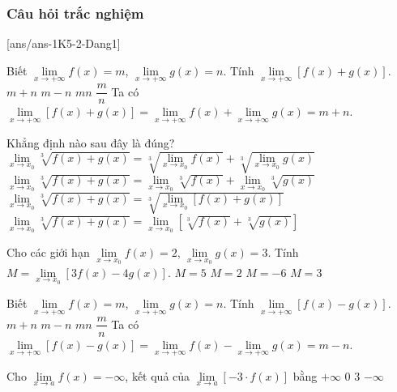 \subsubsection{Câu hỏi trắc nghiệm}
[ans/ans-1K5-2-Dang1]
\begin{ex}%
	Biết $\lim\limits_{x \to +\infty}f(x)=m$, $\lim\limits_{x \to +\infty}g(x)=n$. Tính $\lim\limits_{x \to +\infty}\left[f(x)+g(x)\right]$.
	\choice
	{\True $m+n$}
	{$m-n$}
	{$mn$}
	{$\dfrac{m}{n}$}
	\loigiai
	{
		Ta có $\lim\limits_{x \to +\infty}\left[f(x)+g(x)\right] = \lim\limits_{x \to +\infty}f(x) + \lim\limits_{x \to +\infty}g(x) = m+n$.
	}
\end{ex}


\begin{ex}%
	Khẳng định nào sau đây là đúng?
	\choice
	{$\lim\limits_{x\to x_0} \sqrt[3]{f(x)+g(x)} =\sqrt[3]{\lim\limits_{x \to x_0} f(x)}+\sqrt[3]{\lim\limits_{x \to x_0} g(x)}$}
	{$\lim\limits_{x\to x_0} \sqrt[3]{f(x)+g(x)} =\lim\limits_{x \to x_0}\sqrt[3]{f(x)}+\lim\limits_{x \to x_0}\sqrt[3]{g(x)}$}
	{\True $\lim\limits_{x\to x_0} \sqrt[3]{f(x)+g(x)} =\sqrt[3]{\lim\limits_{x \to x_0} [f(x)+g(x)]}$}
	{$\lim\limits_{x\to x_0} \sqrt[3]{f(x)+g(x)} =\lim\limits_{x \to x_0}\left[\sqrt[3]{f(x)}+\sqrt[3]{g(x)}\right]$}
\end{ex}


\begin{ex}%
	Cho các giới hạn $\lim \limits_{x\rightarrow x_0}f(x)=2$, $\lim \limits_{x\rightarrow x_0}g(x)=3$. Tính $M=\lim \limits_{x\rightarrow x_0}[3f(x)-4g(x)]$.
	\choice
	{$M=5$}
	{$M=2$}
	{\True $M=-6$}
	{$M=3$}
\end{ex}


\begin{ex}%
	Biết $\lim\limits_{x \to +\infty}f(x)=m$, $\lim\limits_{x \to +\infty}g(x)=n$. Tính $\lim\limits_{x \to +\infty}\left[f(x)-g(x)\right]$.
	\choice
	{ $m+n$}
	{\True $m-n$}
	{$mn$}
	{$\dfrac{m}{n}$}
	\loigiai
	{
		Ta có $\lim\limits_{x \to +\infty}\left[f(x)-g(x)\right] = \lim\limits_{x \to +\infty}f(x) - \lim\limits_{x \to +\infty}g(x) = m-n$.
	}
\end{ex}


\begin{ex}%
	Cho $\lim\limits_{x \to a} f(x)=-\infty$, kết quả của $\lim\limits_{x \to a} [-3\cdot f(x)]$ bằng
	\choice
	{\True $+ \infty$}
	{$0$}
	{$3$}
	{$-\infty$}
\end{ex}


